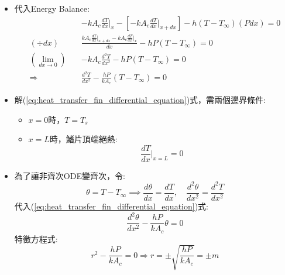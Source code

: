 \documentclass[../main.tex]{subfiles}
\begin{document}
\begin{itemize}
\begin{itemize}
\begin{itemize}
\begin{equation}
      \end{equation}
      \item 能量產生:
      \begin{equation}
        E_\text{gen} = -q_c = -h(T-T_\infty) (Pdx)
      \end{equation}
      P.S. $P$為鰭片的周長
      \item 能量累積:
      \begin{equation}
        E_{\text{acc}} = 0
      \end{equation}
    \end{itemize}
    \item 代入Energy Balance:
    \begin{align}
      & -kA_c \frac{dT}{dx}\bigg|_x - \left[-kA_c \frac{dT}{dx}\bigg|_{x+dx}\right] - h(T-T_\infty) (Pdx) = 0 \nonumber\\
    (\div dx)\quad& \frac{kA_c \frac{dT}{dx}\bigg|_{x+dx} - kA_c \frac{dT}{dx}\bigg|_x}{dx} - hP(T-T_\infty) = 0 \nonumber\\
    (\lim_{dx\to 0})\quad& -kA_c \frac{d^2 T}{dx^2} - hP(T-T_\infty) = 0 \nonumber\\
    \Rightarrow\quad& \frac{d^2 T}{dx^2} - \frac{hP}{kA_c}(T-T_\infty) = 0 \label{eq:heat_transfer_fin_differential_equation}
    \end{align}
    \item 解(\ref{eq:heat_transfer_fin_differential_equation})式，需兩個邊界條件:
    \begin{itemize}
      \item $x=0$時，$T=T_s$
      \item $x=L$時，鰭片頂端絕熱:
      \begin{equation}
        \frac{dT}{dx}\bigg|_{x=L} = 0
      \end{equation}
    \end{itemize}
    \item 為了讓非齊次ODE變齊次，令:
    \begin{equation}
      \theta = T - T_\infty\implies \frac{d\theta}{dx} = \frac{dT}{dx},\quad \frac{d^2 \theta}{dx^2} = \frac{d^2 T}{dx^2}
    \end{equation}
    代入(\ref{eq:heat_transfer_fin_differential_equation})式:
    \begin{equation}
      \frac{d^2 \theta}{dx^2} - \frac{hP}{kA_c}\theta = 0
    \end{equation}
    特徵方程式:
    \begin{equation}
      r^2 - \frac{hP}{kA_c} = 0 \Rightarrow r = \pm \sqrt{\frac{hP}{kA_c}} = \pm m

\end{equation}
\end{itemize}
\end{itemize}
\end{document}
